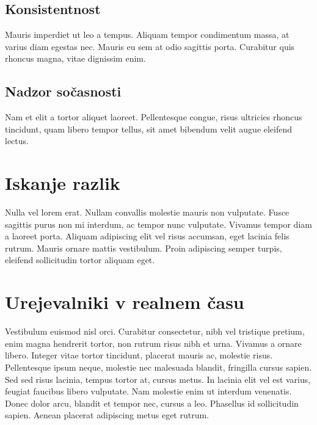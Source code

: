 \documentclass[a4paper, 12pt, twoside]{book}
\begin{document}
\section{Konsistentnost}

Mauris imperdiet ut leo a tempus. Aliquam tempor condimentum massa, at varius diam egestas nec. Mauris eu sem at odio sagittis porta. Curabitur quis rhoncus magna, vitae dignissim enim.

\section{Nadzor sočasnosti}

Nam et elit a tortor aliquet laoreet. Pellentesque congue, risus ultricies rhoncus tincidunt, quam libero tempor tellus, sit amet bibendum velit augue eleifend lectus.

\chapter{Iskanje razlik}
\label{chp:diff}

Nulla vel lorem erat. Nullam convallis molestie mauris non vulputate. Fusce sagittis purus non mi interdum, ac tempor nunc vulputate. Vivamus tempor diam a laoreet porta. Aliquam adipiscing elit vel risus accumsan, eget lacinia felis rutrum. Mauris ornare mattis vestibulum. Proin adipiscing semper turpis, eleifend sollicitudin tortor aliquam eget.

\chapter{Urejevalniki v realnem času}

Vestibulum euismod nisl orci. Curabitur consectetur, nibh vel tristique pretium, enim magna hendrerit tortor, non rutrum risus nibh et urna. Vivamus a ornare libero. Integer vitae tortor tincidunt, placerat mauris ac, molestie risus. Pellentesque ipsum neque, molestie nec malesuada blandit, fringilla cursus sapien. Sed sed risus lacinia, tempus tortor at, cursus metus. In lacinia elit vel est varius, feugiat faucibus libero vulputate. Nam molestie enim ut interdum venenatis. Donec dolor arcu, blandit et tempor nec, cursus a leo. Phasellus id sollicitudin sapien. Aenean placerat adipiscing metus eget rutrum.
\end{document}
